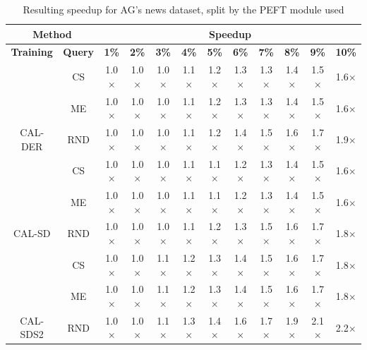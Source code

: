\begin{table}[htbp]
\begin{subtable}{\linewidth}
\begin{tabular}{c|c|cccccccccc}
\toprule
\multicolumn{2}{c|}{\textbf{Method}} & \multicolumn{10}{c}{\textbf{Speedup}} \\
\midrule
\textbf{Training} & \textbf{Query} & \textbf{1\%} & \textbf{2\%} & \textbf{3\%} & \textbf{4\%} & \textbf{5\%} & \textbf{6\%} & \textbf{7\%} & \textbf{8\%} & \textbf{9\%} & \textbf{10\%}\\
\midrule
 & CS & 1.0$\times$ & 1.0$\times$ & 1.0$\times$ & 1.1$\times$ & 1.2$\times$ & 1.3$\times$ & 1.3$\times$ & 1.4$\times$ & 1.5$\times$ & 1.6$\times$\\

 & ME & 1.0$\times$ & 1.0$\times$ & 1.0$\times$ & 1.1$\times$ & 1.2$\times$ & 1.3$\times$ & 1.3$\times$ & 1.4$\times$ & 1.5$\times$ & 1.6$\times$\\

\multirow{-3}{*}{\raggedright\arraybackslash CAL-DER} & RND & 1.0$\times$ & 1.0$\times$ & 1.0$\times$ & 1.1$\times$ & 1.2$\times$ & 1.4$\times$ & 1.5$\times$ & 1.6$\times$ & 1.7$\times$ & 1.9$\times$\\
\midrule
 & CS & 1.0$\times$ & 1.0$\times$ & 1.0$\times$ & 1.1$\times$ & 1.1$\times$ & 1.2$\times$ & 1.3$\times$ & 1.4$\times$ & 1.5$\times$ & 1.6$\times$\\

 & ME & 1.0$\times$ & 1.0$\times$ & 1.0$\times$ & 1.1$\times$ & 1.1$\times$ & 1.2$\times$ & 1.3$\times$ & 1.4$\times$ & 1.5$\times$ & 1.6$\times$\\

\multirow{-3}{*}{\raggedright\arraybackslash CAL-SD} & RND & 1.0$\times$ & 1.0$\times$ & 1.0$\times$ & 1.1$\times$ & 1.2$\times$ & 1.3$\times$ & 1.5$\times$ & 1.6$\times$ & 1.7$\times$ & 1.8$\times$\\
\midrule
 & CS & 1.0$\times$ & 1.0$\times$ & 1.1$\times$ & 1.2$\times$ & 1.3$\times$ & 1.4$\times$ & 1.5$\times$ & 1.6$\times$ & 1.7$\times$ & 1.8$\times$\\

 & ME & 1.0$\times$ & 1.0$\times$ & 1.1$\times$ & 1.2$\times$ & 1.3$\times$ & 1.4$\times$ & 1.5$\times$ & 1.6$\times$ & 1.7$\times$ & 1.8$\times$\\

\multirow{-3}{*}{\raggedright\arraybackslash CAL-SDS2} & RND & 1.0$\times$ & 1.0$\times$ & 1.1$\times$ & 1.3$\times$ & 1.4$\times$ & 1.6$\times$ & 1.7$\times$ & 1.9$\times$ & 2.1$\times$ & 2.2$\times$\\
\bottomrule
\end{tabular}
\end{subtable}
\caption{Resulting speedup for AG's news dataset, split by the PEFT module used}
\label{tab:speedup_short_agnews_10}
\end{table}
